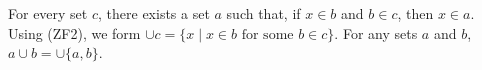 For every set $c$, there exists a set $a$ such that, if $x \in b$ and $b \in c$, then $x \in a$. Using (ZF2), we form $\cup c = \{x \mid x \in b \text{ for some } b \in c\}$. For any sets $a$ and $b$, $a \cup b = \cup \{a, b\}$.
